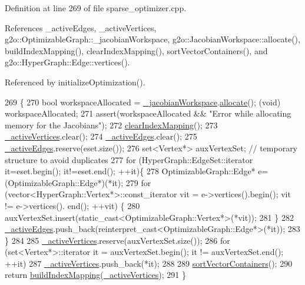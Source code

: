 Definition at line 269 of file sparse\+\_\+optimizer.\+cpp.



References \+\_\+active\+Edges, \+\_\+active\+Vertices, g2o\+::\+Optimizable\+Graph\+::\+\_\+jacobian\+Workspace, g2o\+::\+Jacobian\+Workspace\+::allocate(), build\+Index\+Mapping(), clear\+Index\+Mapping(), sort\+Vector\+Containers(), and g2o\+::\+Hyper\+Graph\+::\+Edge\+::vertices().



Referenced by initialize\+Optimization().


\begin{DoxyCode}
269                                                                      \{
270     \textcolor{keywordtype}{bool} workspaceAllocated = \hyperlink{structg2o_1_1OptimizableGraph_a161c01a29d09cca22e223ab2048eaba8}{\_jacobianWorkspace}.\hyperlink{classg2o_1_1JacobianWorkspace_a8e1d23ced91b721fdb5bd68c8c4e9fc3}{allocate}(); (void) 
      workspaceAllocated;
271     assert(workspaceAllocated && \textcolor{stringliteral}{"Error while allocating memory for the Jacobians"});
272     \hyperlink{classg2o_1_1SparseOptimizer_ab6f1f4ad2b1fd50b8019c6abb89ac6a8}{clearIndexMapping}();
273     \hyperlink{classg2o_1_1SparseOptimizer_a805e1db97802980fa4dfef95cfa5e63e}{\_activeVertices}.clear();
274     \hyperlink{classg2o_1_1SparseOptimizer_a3207df163943bc1672fc7872964a6d6c}{\_activeEdges}.clear();
275     \hyperlink{classg2o_1_1SparseOptimizer_a3207df163943bc1672fc7872964a6d6c}{\_activeEdges}.reserve(eset.size());
276     set<Vertex*> auxVertexSet; \textcolor{comment}{// temporary structure to avoid duplicates}
277     \textcolor{keywordflow}{for} (HyperGraph::EdgeSet::iterator it=eset.begin(); it!=eset.end(); ++it)\{
278       OptimizableGraph::Edge* e=(OptimizableGraph::Edge*)(*it);
279       \textcolor{keywordflow}{for} (vector<HyperGraph::Vertex*>::const\_iterator vit = e->vertices().begin(); vit != e->vertices().
      end(); ++vit) \{
280         auxVertexSet.insert(static\_cast<OptimizableGraph::Vertex*>(*vit));
281       \}
282       \hyperlink{classg2o_1_1SparseOptimizer_a3207df163943bc1672fc7872964a6d6c}{\_activeEdges}.push\_back(reinterpret\_cast<OptimizableGraph::Edge*>(*it));
283     \}
284 
285     \hyperlink{classg2o_1_1SparseOptimizer_a805e1db97802980fa4dfef95cfa5e63e}{\_activeVertices}.reserve(auxVertexSet.size());
286     \textcolor{keywordflow}{for} (set<Vertex*>::iterator it = auxVertexSet.begin(); it != auxVertexSet.end(); ++it)
287       \hyperlink{classg2o_1_1SparseOptimizer_a805e1db97802980fa4dfef95cfa5e63e}{\_activeVertices}.push\_back(*it);
288 
289     \hyperlink{classg2o_1_1SparseOptimizer_a8a8c6f08bc9b8a4e520aa73198268991}{sortVectorContainers}();
290     \textcolor{keywordflow}{return} \hyperlink{classg2o_1_1SparseOptimizer_a8c6af9785e85153ade1490beacad73ce}{buildIndexMapping}(\hyperlink{classg2o_1_1SparseOptimizer_a805e1db97802980fa4dfef95cfa5e63e}{\_activeVertices});
291   \}
\end{DoxyCode}
